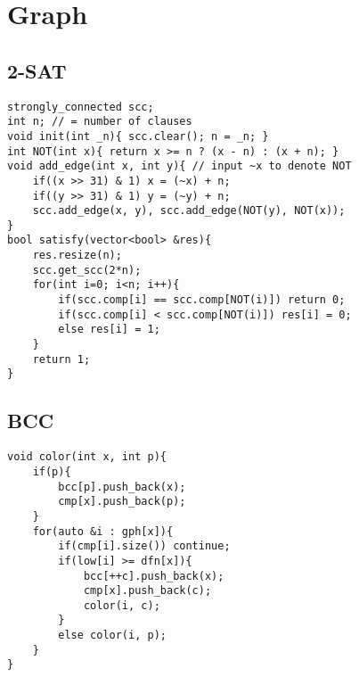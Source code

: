 \documentclass[landscape, 8pt, a4paper, oneside, twocolumn]{extarticle}
\begin{document}
\section{Graph}
\subsection {2-SAT}
\begin{verbatim}
strongly_connected scc;
int n; // = number of clauses
void init(int _n){ scc.clear(); n = _n; }
int NOT(int x){ return x >= n ? (x - n) : (x + n); }
void add_edge(int x, int y){ // input ~x to denote NOT
	if((x >> 31) & 1) x = (~x) + n;
	if((y >> 31) & 1) y = (~y) + n;
	scc.add_edge(x, y), scc.add_edge(NOT(y), NOT(x));
}
bool satisfy(vector<bool> &res){
	res.resize(n);
	scc.get_scc(2*n);
	for(int i=0; i<n; i++){
		if(scc.comp[i] == scc.comp[NOT(i)]) return 0;
		if(scc.comp[i] < scc.comp[NOT(i)]) res[i] = 0;
		else res[i] = 1;
	}
	return 1;
}
\end{verbatim}
\subsection {BCC}
\begin{verbatim}
void color(int x, int p){
	if(p){
		bcc[p].push_back(x);
		cmp[x].push_back(p);
	}
	for(auto &i : gph[x]){
		if(cmp[i].size()) continue;
		if(low[i] >= dfn[x]){
			bcc[++c].push_back(x);
			cmp[x].push_back(c);
			color(i, c);
		}
		else color(i, p);
	}
}
\end{verbatim}
\end{document}
